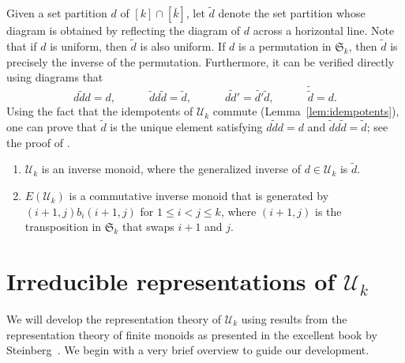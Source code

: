 \documentclass[ALCO,Unicode]{cedram}
\begin{document}
Given a set partition $d$ of $[k] \cap [\bar{k}]$,
let $\widetilde{d}$ denote the set partition whose diagram is obtained by
reflecting the diagram of $d$ across a horizontal line.
Note that if $d$ is uniform, then $\widetilde{d}$ is also uniform.
If $d$ is a permutation in $\mathfrak{S}_k$,
then $\widetilde{d}$ is precisely the inverse of the permutation.
Furthermore, it can be verified directly using diagrams that
\begin{equation*}
    d\widetilde{d}d = d,
    \qquad\quad
    \widetilde{d}d\widetilde{d} = \widetilde{d},
    \qquad\quad
    \widetilde{dd'} = \widetilde{d'}\widetilde{d},
    \qquad\quad
    \tilde{\tilde{d}} = d.
\end{equation*}
Using the fact that the idempotents of $\mathcal{U}_k$ commute
(Lemma~\ref{lem:idempotents}), one can prove that $\widetilde{d}$ is the unique
element satisfying
$d\widetilde{d}d = d$ and $\widetilde{d}d\widetilde{d} = \widetilde{d}$;
see the proof of \cite[Theorem~3.2]{Steinberg.2016}.
\begin{prop} \leavevmode
    \begin{enumerate}
        \item
            $\mathcal{U}_k$ is an inverse monoid,
            where the generalized inverse of $d \in \mathcal{U}_k$ is $\widetilde{d}$.

        \item
            $E(\mathcal{U}_k)$ is a commutative inverse monoid
            that is generated by
            $(i+1,j) b_i (i+1,j)$ for $1\leqslant i < j \leqslant k$,
            where $(i+1,j)$ is the transposition in $\mathfrak{S}_k$ that swaps $i+1$ and $j$.
    \end{enumerate}
\end{prop}

\section{Irreducible representations of $\mathcal{U}_k$}
\label{section.irreps of Uk}

We will develop the representation theory of $\mathcal{U}_k$
using results from the representation theory of finite monoids
as presented in the excellent book by Steinberg~\cite{Steinberg.2016}.
We begin with a very brief overview to guide our development.
\end{document}
